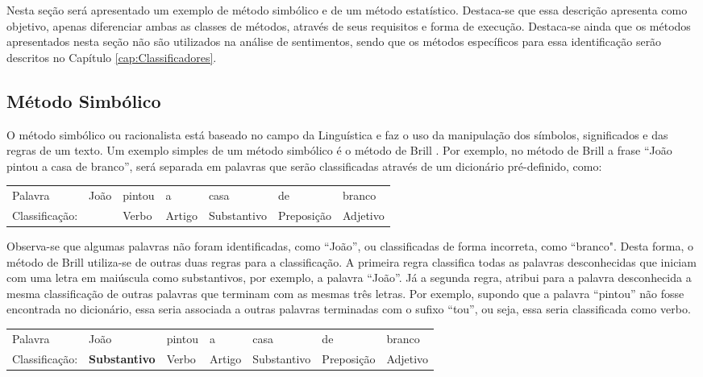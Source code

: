Nesta seção será apresentado um exemplo de método simbólico e de um método
estatístico.
Destaca-se que essa descrição apresenta como objetivo, apenas
diferenciar ambas as classes de métodos, através de seus requisitos e forma de execução.
Destaca-se ainda que os métodos apresentados nesta seção não são utilizados na
análise de sentimentos, sendo que os métodos específicos para essa
identificação serão descritos no Capítulo \ref{cap:Classificadores}.


\subsection{Método Simbólico}
O método simbólico ou racionalista está
baseado no campo da Linguística e faz o uso da manipulação dos símbolos,
significados e das regras de um texto. Um exemplo simples de um método simbólico
é o método de Brill \cite{Brill:1992:SRP:974499.974526}. Por exemplo, no método de
Brill a frase ``João pintou a casa de branco'', será separada em palavras que
serão classificadas através de um dicionário pré-definido, como:

\begin{table}[htb]
\centering
\begin{tabular}{l|l|l|l|l|l|l}
Palavra         & João        & pintou & a      & casa        & de
& branco
\\
Classificação:   & 			   & Verbo  & Artigo & Substantivo & Preposição & Adjetivo
\end{tabular}
\label{my-label}
\end{table}

Observa-se que algumas palavras não foram
identificadas, como ``João'', ou classificadas de forma incorreta, como
``branco". Desta forma, o método de Brill utiliza-se de outras duas regras para
a classificação.
A primeira regra classifica todas as palavras desconhecidas que iniciam com uma
letra em maiúscula como substantivos, por exemplo, a palavra ``João''. Já a
segunda regra, atribui para a palavra desconhecida a mesma classificação de outras palavras que terminam com as mesmas três letras. Por exemplo, supondo
que a palavra ``pintou'' não fosse encontrada no dicionário, essa seria
associada a outras palavras terminadas com o sufixo ``tou'', ou seja, essa seria
classificada como verbo.

\begin{table}[htb]
\centering
\begin{tabular}{l|l|l|l|l|l|l}
Palavra         & João        & pintou & a      & casa        & de
& branco
\\
Classificação:   & \textbf{Substantivo} & Verbo  & Artigo & Substantivo &
Preposição & Adjetivo
\end{tabular}
\label{my-label}
\end{table}



